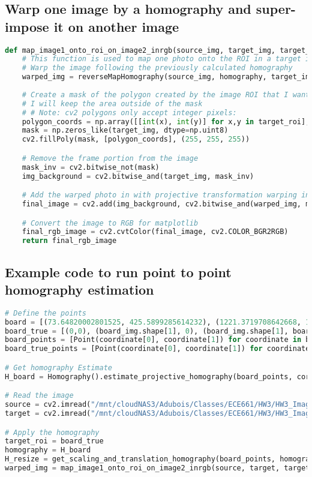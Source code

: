 \documentclass{article}
\begin{document}
\subsection{Warp one image by a homography and super-impose it on another image}
\begin{lstlisting}[language=Python]
def map_image1_onto_roi_on_image2_inrgb(source_img, target_img, target_roi, homography):
    # This function is used to map one photo onto the ROI in a target image
    # Warp the image following the previously calculated homography
    warped_img = reverseMapHomography(source_img, homography, target_img.shape)
    
    # Create a mask of the polygon created by the image ROI that I want to cover
    # I will keep the area outside of the mask
    # # Note: cv2 polygons only accept integer pixels:
    polygon_coords = np.array([[int(x), int(y)] for x,y in target_roi], dtype=np.int32)
    mask = np.zeros_like(target_img, dtype=np.uint8)
    cv2.fillPoly(mask, [polygon_coords], (255, 255, 255))

    # Remove the frame portion from the image
    mask_inv = cv2.bitwise_not(mask)
    img_background = cv2.bitwise_and(target_img, mask_inv)

    # Add the warped photo in with projective transformation warping in
    final_image = cv2.add(img_background, cv2.bitwise_and(warped_img, mask))

    # Convert the image to RGB for matplotlib
    final_rgb_image = cv2.cvtColor(final_image, cv2.COLOR_BGR2RGB)
    return final_rgb_image

\end{lstlisting}
\subsection{Example code to run point to point homography estimation}
\begin{lstlisting}[language=Python]
# Define the points
board = [(73.64820002801525, 425.5899285614232), (1221.3719708642668, 139.16325815940627), (1356.5169491525423, 1954.5435635243032), (422.6046365037121, 1795.1935144978288)]
board_true = [(0,0), (board_img.shape[1], 0), (board_img.shape[1], board_img.shape[0]), (0, board_img.shape[0])]
board_points = [Point(coordinate[0], coordinate[1]) for coordinate in board]
board_true_points = [Point(coordinate[0], coordinate[1]) for coordinate in board_true]

# Get homography Estimate
H_board = Homography().estimate_projective_homography(board_points, corridor_true_points)

# Read the image
source = cv2.imread("/mnt/cloudNAS3/Adubois/Classes/ECE661/HW3/HW3_Images/board_1.jpeg")
target = cv2.imread("/mnt/cloudNAS3/Adubois/Classes/ECE661/HW3/HW3_Images/board_1.jpeg")

# Apply the homography
target_roi = board_true
homography = H_board
H_resize = get_scaling_and_translation_homography(board_points, homography, (target.shape[1], target.shape[0]))
warped_img = map_image1_onto_roi_on_image2_inrgb(source, target, target_roi, H_resize@homography)
\end{lstlisting}
\end{document}
